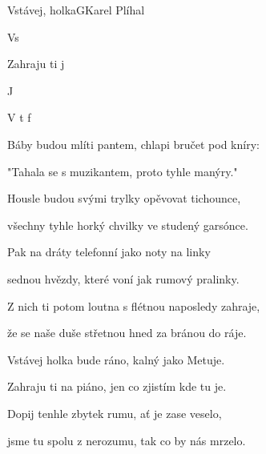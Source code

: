 \begin{song}{Vstávej, holka}{G}{Karel Plíhal}

\begin{SBVerse}

Vs 

   Zahraju ti   j

   J  

   V t  f

\end{SBVerse}

\begin{SBVerse}

Báby budou mlíti pantem, chlapi bručet pod kníry:

   "Tahala se s muzikantem, proto tyhle manýry."

   Housle budou svými trylky opěvovat tichounce,

   všechny tyhle horký chvilky ve studený garsónce.

\end{SBVerse}

\begin{SBVerse}

Pak na dráty telefonní jako noty na linky

   sednou hvězdy, které voní jak rumový pralinky.

   Z nich ti potom loutna s flétnou naposledy zahraje,

   že se naše duše střetnou hned za bránou do ráje.

\end{SBVerse}

\begin{SBVerse}

Vstávej holka bude ráno, kalný jako Metuje.

   Zahraju ti na piáno, jen co zjistím kde tu je.

   Dopij tenhle zbytek rumu, ať je zase veselo,

   jsme tu spolu z nerozumu, tak co by nás mrzelo.

\end{SBVerse}

\end{song}

\pagebreak